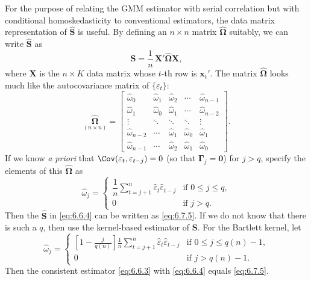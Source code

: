 For the purpose of relating the GMM estimator with serial correlation but with
conditional homoskedasticity to conventional estimators, the data matrix representation
of $\hat{\mathbf{S}}$ is useful. By defining an $n \times n$ matrix $\hat{\bm{\Omega}}$ suitably, we can write $\hat{\mathbf{S}}$ as
\begin{equation}
  \hat{\mathbf{S}} = \frac{1}{n}\,\mathbf{X}' \hat{\bm{\Omega}} \mathbf{X},
  \label{eq:6.7.5}
\end{equation}
where $\mathbf{X}$ is the $n \times K$ data matrix whose $t$-th row is $\mathbf{x}_t'$. The matrix $\hat{\bm{\Omega}}$ looks much
like the autocovariance matrix of $\{\varepsilon_t\}$:
\begin{equation}
  \underset{(n \times n)}{\hat{\bm{\Omega}}} =
  \begin{bmatrix}
    \hat{\omega}_0 & \hat{\omega}_1 & \hat{\omega}_2 & \cdots & \hat{\omega}_{n-1} \\
    \hat{\omega}_1 & \hat{\omega}_0 & \hat{\omega}_1 & \cdots & \hat{\omega}_{n-2} \\
    \vdots & \ddots & \ddots & \ddots & \vdots \\
    \hat{\omega}_{n-2} & \cdots & \hat{\omega}_1 & \hat{\omega}_0 & \hat{\omega}_1 \\
    \hat{\omega}_{n-1} & \cdots & \hat{\omega}_2 & \hat{\omega}_1 & \hat{\omega}_0
  \end{bmatrix}.
  \label{eq:6.7.6}
\end{equation}
If we know \emph{a priori} that $\Cov(\varepsilon_t, \varepsilon_{t-j}) = 0$ (so that $\bm{\Gamma}_j = \mathbf{0}$) for $j > q$, specify the
elements of this $\hat{\bm{\Omega}}$ as
\begin{equation}
  \hat{\omega}_j = \begin{cases}
    \dfrac{1}{n} \displaystyle\sum_{t=j+1}^{n} \hat{\varepsilon}_t \hat{\varepsilon}_{t-j} & \text{if } 0 \leq j \leq q, \\[8pt]
    0 & \text{if } j > q.
  \end{cases}
  \label{eq:6.7.7}
\end{equation}
Then the $\hat{\mathbf{S}}$ in \eqref{eq:6.6.4} can be written as \eqref{eq:6.7.5}. If we do not know that there is such
a $q$, then use the kernel-based estimator of $\mathbf{S}$. For the Bartlett kernel, let
\begin{equation}
  \hat{\omega}_j = \begin{cases}
    \displaystyle\left[1 - \frac{j}{q(n)}\right] \frac{1}{n} \sum_{t=j+1}^{n} \hat{\varepsilon}_t \hat{\varepsilon}_{t-j}
    & \text{if } 0 \leq j \leq q(n) - 1, \\[8pt]
    0 & \text{if } j > q(n) - 1.
  \end{cases}
  \label{eq:6.7.8}
\end{equation}
Then the consistent estimator \eqref{eq:6.6.3} with \eqref{eq:6.6.4} equals \eqref{eq:6.7.5}.

